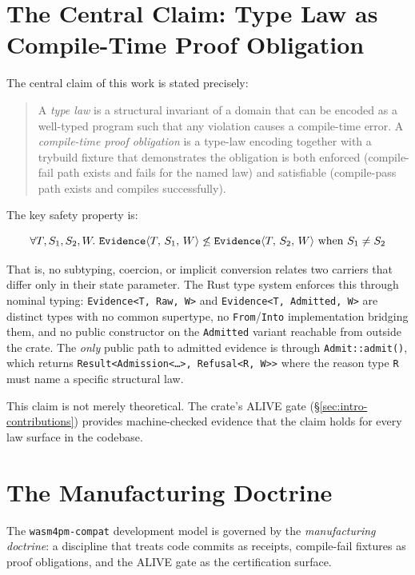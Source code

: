 \section{The Central Claim: Type Law as Compile-Time Proof Obligation}
\label{sec:intro-claim}

The central claim of this work is stated precisely:

\begin{quote}
  A \emph{type law} is a structural invariant of a domain that can be
  encoded as a well-typed program such that any violation causes a
  compile-time error. A \emph{compile-time proof obligation} is a type-law
  encoding together with a trybuild fixture that demonstrates the obligation is
  both enforced (compile-fail path exists and fails for the named law) and
  satisfiable (compile-pass path exists and compiles successfully).
\end{quote}

The key safety property is:

\begin{equation}
  \label{eq:type-law-safety}
  \forall T, S_1, S_2, W.\
  \texttt{Evidence}\langle T,\, S_1,\, W \rangle \not\leq \texttt{Evidence}\langle T,\, S_2,\, W \rangle
  \text{ when } S_1 \neq S_2
\end{equation}

That is, no subtyping, coercion, or implicit conversion relates two
\Evidence{}{}{} carriers that differ only in their state parameter. The Rust
type system enforces this through nominal typing: \texttt{Evidence<T, Raw, W>}
and \texttt{Evidence<T, Admitted, W>} are distinct types with no common
supertype, no \texttt{From}/\texttt{Into} implementation bridging them, and no
public constructor on the \texttt{Admitted} variant reachable from outside the
crate. The \emph{only} public path to admitted evidence is through
\texttt{Admit::admit()}, which returns \texttt{Result<Admission<\ldots>,
Refusal<R, W>>} where the reason type \texttt{R} must name a specific
structural law.

This claim is not merely theoretical. The crate's ALIVE gate
(\S\ref{sec:intro-contributions}) provides machine-checked evidence that the
claim holds for every law surface in the codebase.

\section{The Manufacturing Doctrine}
\label{sec:intro-doctrine}

The \texttt{wasm4pm-compat} development model is governed by the
\emph{manufacturing doctrine}: a discipline that treats code commits as
receipts, compile-fail fixtures as proof obligations, and the ALIVE gate as the
certification surface.

